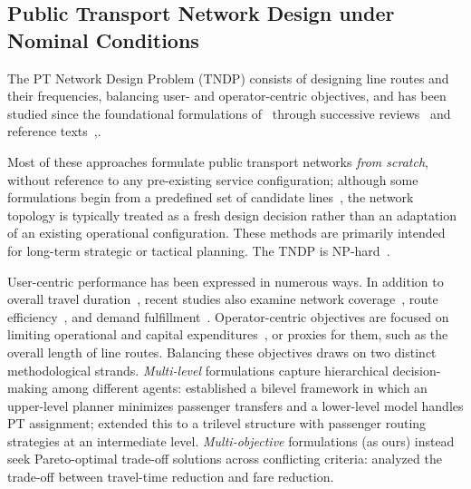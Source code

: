 \documentclass[a4paper,fleqn]{cas-sc}
\begin{document}
\subsection{Public Transport Network Design under Nominal Conditions}
\label{sec:preventive}

The PT Network Design Problem (TNDP) consists of designing line routes and their frequencies, balancing user- and operator-centric objectives, and has been studied since the foundational formulations of~\cite{ceder1986bus} through successive reviews~\citep{guihaire2008transit, kepaptsoglou2009transit, duran2022survey} and reference texts~\citep{desaulniers2007public, ceder2016public},\cite{gkiotsalitis2020public}.

Most of these approaches formulate public transport networks \emph{from scratch}, without reference to any pre-existing service configuration; although some formulations begin from a predefined set of candidate lines~\citep{cervantes2023analyzing}, the network topology is typically treated as a fresh design decision rather than an adaptation of an existing operational configuration. These methods are primarily intended for long-term strategic or tactical planning.
The TNDP is NP-hard~\citep{magnanti1984network}.

User-centric performance has been expressed in numerous ways. In addition to overall travel duration~\citep{john2014improved,heyken2019adaptive}, recent studies also examine network coverage~\citep{cadarso2017rapid}, route efficiency~\citep{suman2019improvement}, and demand fulfillment~\citep{barahimi2021multi}. Operator-centric objectives are focused on limiting operational and capital expenditures~\citep{ahern2022approximate,chen2018continuum,calabro2023adaptive}, or proxies for them, such as the overall length of line routes.
%
Balancing these objectives draws on two distinct methodological strands. \emph{Multi-level} formulations capture hierarchical decision-making among different agents: \cite{szeto2014transit} established a bilevel framework in which an upper-level planner minimizes passenger transfers and a lower-level model handles PT assignment; \cite{tian2021service} extended this to a trilevel structure with passenger routing strategies at an intermediate level. \emph{Multi-objective} formulations (as ours) instead seek Pareto-optimal trade-off solutions across conflicting criteria: \cite{cervantes2023analyzing} analyzed the trade-off between travel-time reduction and fare reduction. 
\end{document}
